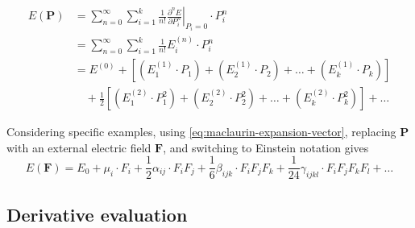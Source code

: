 \documentclass[%
class = book,%
crop = false,%
float = true,%
multi = true,%
preview = false,%
]{standalone}
\begin{document}
\begin{equation}
  \label{eq:maclaurin-expansion-vector}
  \begin{aligned}
    E(\mathbf{P}) &= \sum_{n = 0}^{\infty} \sum_{i = 1}^{k} \frac{1}{n!} \left. \frac{\partial^{n} E}{\partial P_{i}^{n}} \right|_{P_{i} = 0} \cdot P_{i}^{n} \\
    &= \sum_{n = 0}^{\infty} \sum_{i = 1}^{k} \frac{1}{n!} E_{i}^{(n)} \cdot P_{i}^{n} \\
    &= E^{(0)} + \left[ (E_{1}^{(1)} \cdot P_{1}) + (E_{2}^{(1)} \cdot P_{2}) + \dots + (E_{k}^{(1)} \cdot P_{k}) \right] \\
    &\quad + \frac{1}{2} \left[ (E_{1}^{(2)} \cdot P_{1}^{2}) + (E_{2}^{(2)} \cdot P_{2}^{2}) + \dots + (E_{k}^{(2)} \cdot P_{k}^{2}) \right] + \dots
  \end{aligned}
\end{equation}

Considering specific examples, using \eqref{eq:maclaurin-expansion-vector}, replacing \(\mathbf{P}\) with an external electric field \(\mathbf{F}\), and switching to Einstein notation gives
\begin{equation}
  \label{eq:electric-field-expansion}
  E(\mathbf{F}) = E_{0} + \mu_{i} \cdot F_{i} + \frac{1}{2} \alpha_{ij} \cdot F_{i}F_{j} + \frac{1}{6} \beta_{ijk} \cdot F_{i}F_{j}F_{k} + \frac{1}{24} \gamma_{ijkl} \cdot F_{i}F_{j}F_{k}F_{l} + \dots
\end{equation}

\subsection{Derivative evaluation}
\label{ssec:derivative-evaluation}
\end{document}
